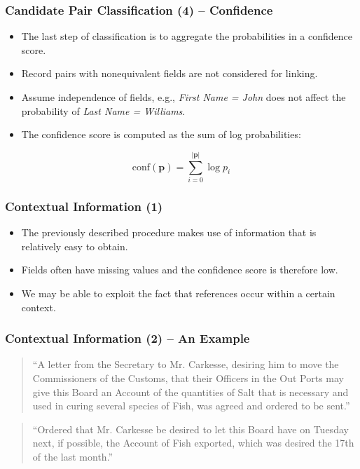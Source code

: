 \documentclass[12pt]{beamer}
\theoremstyle{break}
\begin{document}
\begin{frame}
	\frametitle{Candidate Pair Classification (4) -- Confidence}
	
	\begin{itemize}
		\item The last step of classification is to aggregate the probabilities in a \alert{confidence score}.
		\item Record pairs with nonequivalent fields are not considered for linking.
		\item Assume \alert{independence} of fields, e.g., \textit{First Name = John} does not affect the probability of \textit{Last Name = Williams}.
		\item The confidence score is computed as the sum of log probabilities:
	\end{itemize}
	
	\begin{equation*}
		\mathrm{conf}(\bm{p})=\sum_{i=0}^{\left\vert \bm{p} \right\vert}\log{p_i}
	\end{equation*}

\end{frame}




\begin{frame}
	\frametitle{Contextual Information (1)}
	
	\begin{itemize}
		\item The previously described procedure makes use of information that is relatively easy to obtain.
		\item Fields often have \alert{missing values} and the confidence score is therefore low.
		\item We may be able to exploit the fact that references occur within a certain \alert{context}.
	\end{itemize}

\end{frame}




\begin{frame}
	\frametitle{Contextual Information (2) -- An Example}

	\begin{quote}
	    ``A letter from the Secretary to Mr. Carkesse, desiring him to move the Commissioners of the Customs, that their Officers in the Out Ports may give this Board an Account of the quantities of Salt that is necessary and used in curing several species of Fish, was agreed and ordered to be sent.''
	\end{quote}
	
	\bigskip
	
	\begin{quote}
	    ``Ordered that Mr. Carkesse be desired to let this Board have on Tuesday next, if possible, the Account of Fish exported, which was desired the 17th of the last month.''
	\end{quote}
	
\end{frame}
\end{document}
